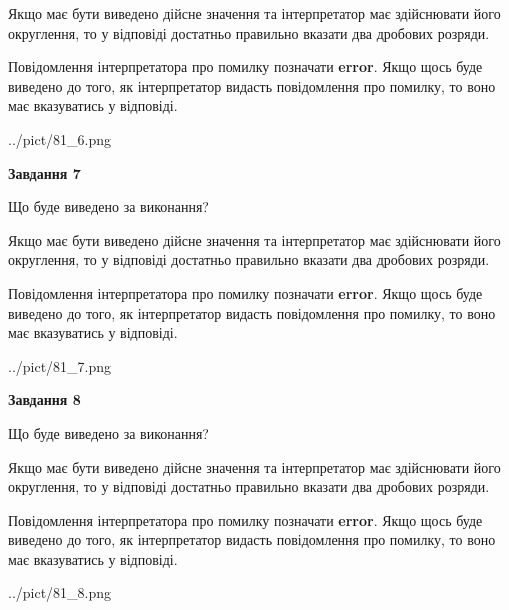 \documentclass[12pt, ukrainian]{article}
\begin{document}
{\begin {Large}
Якщо має бути виведено дійсне значення та інтерпретатор має здійснювати його округлення, 
то у відповіді достатньо правильно вказати два дробових розряди.

Повідомлення інтерпретатора про помилку позначати \textbf{error}.
Якщо щось буде виведено до того, як інтерпретатор видасть повідомлення про помилку, 
то воно має вказуватись у відповіді. \par

\begin{center}
	{../pict/81_6.png}
\end{center}
\newpage

{\begin {center}\textbf{Завдання 7}\end {center}}\par
Що буде виведено за виконання? \par

Якщо має бути виведено дійсне значення та інтерпретатор має здійснювати його округлення, 
то у відповіді достатньо правильно вказати два дробових розряди.

Повідомлення інтерпретатора про помилку позначати \textbf{error}.
Якщо щось буде виведено до того, як інтерпретатор видасть повідомлення про помилку, 
то воно має вказуватись у відповіді. \par

\begin{center}
	{../pict/81_7.png}
\end{center}
\newpage

{\begin {center}\textbf{Завдання 8}\end {center}}\par
Що буде виведено за виконання? \par

Якщо має бути виведено дійсне значення та інтерпретатор має здійснювати його округлення, 
то у відповіді достатньо правильно вказати два дробових розряди.

Повідомлення інтерпретатора про помилку позначати \textbf{error}.
Якщо щось буде виведено до того, як інтерпретатор видасть повідомлення про помилку, 
то воно має вказуватись у відповіді. \par

\begin{center}
	{../pict/81_8.png}
\end{center}
\newpage


\end{Large}}
\end{document}
